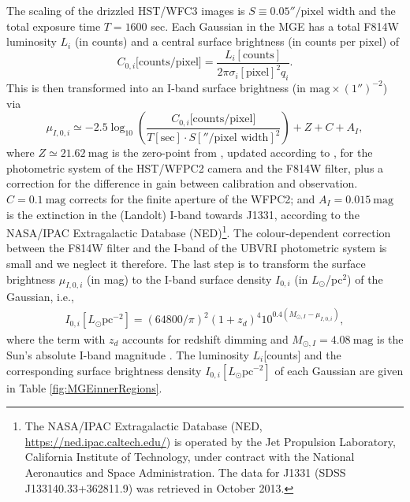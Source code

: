 \documentclass[useAMS,usenatbib]{mnras}
\begin{document}
The scaling of the drizzled HST/WFC3 images is  $S \equiv 0.05''/\text{pixel width}$ and the total exposure time $T = 1600$ sec. Each Gaussian in the MGE has a total F814W luminosity $L_i$ (in counts) and a central surface brightness (in counts per pixel) of
\begin{equation*}
C_{0,i}\text{[counts/pixel]} = \frac{L_i[\text{counts}]}{2\pi \sigma_i[\text{pixel}]^2 q_i}.
\end{equation*}
This is then transformed into an I-band surface brightness (in $\text{mag}\times(1'')^{-2}$) via
\begin{equation}
\mu_{I,0,i} \simeq -2.5 \log_{10}\left( \frac{C_{0,i}\text{[counts/pixel]}}{T[\text{sec}] \cdot S[''/\text{pixel width}]^2}\right) + Z + C + A_I, \label{eq:muI_}
\end{equation}
where $Z\simeq21.62~\text{mag}$ is the zero-point from \citet{Holtzman}, updated according to \citet{Dolphin,DolphinNew}, for the photometric system of the HST/WFPC2 camera and the F814W filter, plus a correction for the difference in gain between calibration and observation. $C= 0.1~\text{mag}$ corrects for the finite aperture of the WFPC2; and $A_I =0.015~\text{mag}$ is the extinction in the (Landolt) I-band towards J1331, according to the NASA/IPAC Extragalactic Database (NED)\footnote{The NASA/IPAC Extragalactic Database (NED, \url{https://ned.ipac.caltech.edu/}) is operated by the Jet Propulsion Laboratory, California Institute of Technology, under contract with the National Aeronautics and Space Administration. The data for J1331 (SDSS J133140.33+362811.9) was retrieved in October 2013.}. The colour-dependent correction between the F814W filter and the I-band of the UBVRI photometric system is  small \citep{Holtzman} and we neglect it therefore. The last step is to transform the surface brightness $\mu_{I,0,i}$ (in mag) to the I-band surface density $I_{0,i}$ (in $L_\odot$/pc$^2$) of the Gaussian, i.e.,
\begin{eqnarray*}
I_{0,i}[L_\odot \text{pc}^{-2}] = \left( 64800/\pi\right)^2 \left(1+z_d \right)^4 10^{0.4\left(M_{\odot,I}-\mu_{I,0,i} \right)},
\end{eqnarray*}
where the term with $z_d$ accounts for redshift dimming and $M_{\odot,I}=4.08~\text{mag}$ is the Sun's absolute I-band magnitude \citep{1998gaas.book.....B}. The luminosity $L_i$[counts] and the corresponding surface brightness density $I_{0,i} [L_\odot \text{pc}^{-2}]$ of each Gaussian are given in Table \ref{fig:MGEinnerRegions}.
\end{document}
